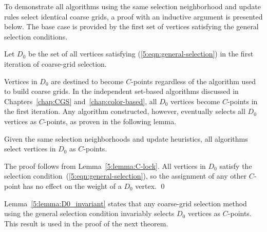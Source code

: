 \documentclass{elsart}
\newenvironment{proof}{\begin{pf}}{\qed\end{pf}}
\begin{document}
To demonstrate all algorithms using the same selection neighborhood
and update rules select identical coarse grids, a proof with an
inductive argument is presented below. The base case is provided by
the first set of vertices satisfying the general selection conditions.
\begin{defn}
Let $D_0$ be the set of all vertices satisfying
(\ref{5:eqn:general-selection}) in the first iteration of coarse-grid
selection.
\end{defn}

Vertices in $D_0$ are destined to become $C$-points regardless of the
algorithm used to build coarse grids. In the independent set-based
algorithms discussed in Chapters~\ref{chap:CGS}
and~\ref{chap:color-based}, all $D_0$ vertices become $C$-points in
the first iteration. Any algorithm constructed, however, eventually
selects all $D_0$ vertices as $C$-points, as proven in the following
lemma.
\begin{lem}
\label{5:lemma:D0_invariant}
Given the same selection neighborhoods and update heuristics, all
algorithms select vertices in $D_0$ as $C$-points.
\end{lem}
\begin{proof}
The proof follows from Lemma~\ref{5:lemma:C-lock}. All vertices in
$D_0$ satisfy the selection condition~(\ref{5:eqn:general-selection}),
so the assignment of any other $C$-point has no effect on the weight
of a $D_0$ vertex.
\end{proof}

Lemma~\ref{5:lemma:D0_invariant} states that any coarse-grid selection
method using the general selection condition invariably selects $D_0$
vertices as $C$-points. This result is used in the proof of the next
theorem.
\end{document}
